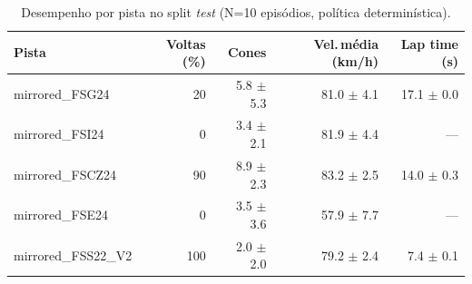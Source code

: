 \begin{table}[H]
\centering
\caption{Desempenho por pista no split \textit{test} (N=10 episódios, política determinística).}
\label{tab:per_track_test}
\begin{tabular}{lrrrr}
\toprule
\textbf{Pista} & \textbf{Voltas (\%)} & \textbf{Cones} & \textbf{Vel.\,m\'edia (km/h)} & \textbf{Lap time (s)} \\
\midrule
mirrored_FSG24 & 20 & 5.8 $\pm$ 5.3 & 81.0 $\pm$ 4.1 & 17.1 $\pm$ 0.0 \\
mirrored_FSI24 & 0 & 3.4 $\pm$ 2.1 & 81.9 $\pm$ 4.4 & --- \\
mirrored_FSCZ24 & 90 & 8.9 $\pm$ 2.3 & 83.2 $\pm$ 2.5 & 14.0 $\pm$ 0.3 \\
mirrored_FSE24 & 0 & 3.5 $\pm$ 3.6 & 57.9 $\pm$ 7.7 & --- \\
mirrored_FSS22_V2 & 100 & 2.0 $\pm$ 2.0 & 79.2 $\pm$ 2.4 & 7.4 $\pm$ 0.1 \\
\bottomrule
\end{tabular}
\end{table}
